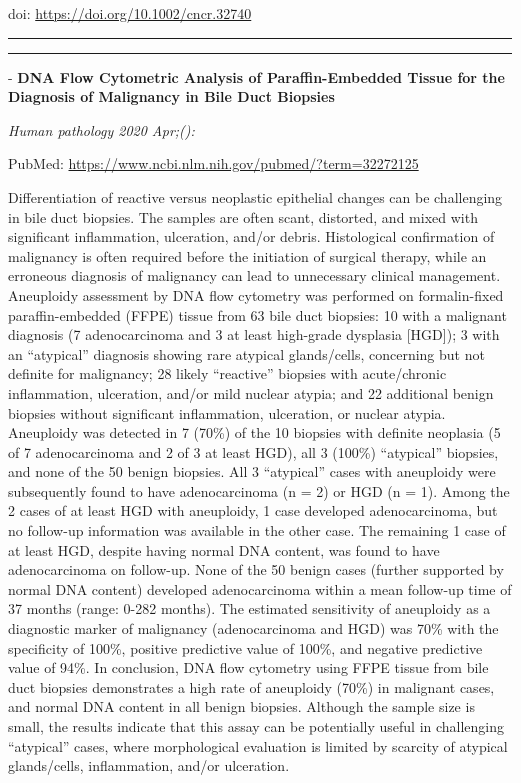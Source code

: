 \documentclass[
]{article}
\begin{document}
doi: \url{https://doi.org/10.1002/cncr.32740}

\begin{center}\rule{0.5\linewidth}{0.5pt}\end{center}

\begin{center}\rule{0.5\linewidth}{0.5pt}\end{center}

- \textbf{DNA Flow Cytometric Analysis of Paraffin-Embedded Tissue for
the Diagnosis of Malignancy in Bile Duct Biopsies}

\emph{Human pathology 2020 Apr;():}

PubMed: \url{https://www.ncbi.nlm.nih.gov/pubmed/?term=32272125}

Differentiation of reactive versus neoplastic epithelial changes can be
challenging in bile duct biopsies. The samples are often scant,
distorted, and mixed with significant inflammation, ulceration, and/or
debris. Histological confirmation of malignancy is often required before
the initiation of surgical therapy, while an erroneous diagnosis of
malignancy can lead to unnecessary clinical management. Aneuploidy
assessment by DNA flow cytometry was performed on formalin-fixed
paraffin-embedded (FFPE) tissue from 63 bile duct biopsies: 10 with a
malignant diagnosis (7 adenocarcinoma and 3 at least high-grade
dysplasia {[}HGD{]}); 3 with an ``atypical'' diagnosis showing rare
atypical glands/cells, concerning but not definite for malignancy; 28
likely ``reactive'' biopsies with acute/chronic inflammation,
ulceration, and/or mild nuclear atypia; and 22 additional benign
biopsies without significant inflammation, ulceration, or nuclear
atypia. Aneuploidy was detected in 7 (70\%) of the 10 biopsies with
definite neoplasia (5 of 7 adenocarcinoma and 2 of 3 at least HGD), all
3 (100\%) ``atypical'' biopsies, and none of the 50 benign biopsies. All
3 ``atypical'' cases with aneuploidy were subsequently found to have
adenocarcinoma (n = 2) or HGD (n = 1). Among the 2 cases of at least HGD
with aneuploidy, 1 case developed adenocarcinoma, but no follow-up
information was available in the other case. The remaining 1 case of at
least HGD, despite having normal DNA content, was found to have
adenocarcinoma on follow-up. None of the 50 benign cases (further
supported by normal DNA content) developed adenocarcinoma within a mean
follow-up time of 37 months (range: 0-282 months). The estimated
sensitivity of aneuploidy as a diagnostic marker of malignancy
(adenocarcinoma and HGD) was 70\% with the specificity of 100\%,
positive predictive value of 100\%, and negative predictive value of
94\%. In conclusion, DNA flow cytometry using FFPE tissue from bile duct
biopsies demonstrates a high rate of aneuploidy (70\%) in malignant
cases, and normal DNA content in all benign biopsies. Although the
sample size is small, the results indicate that this assay can be
potentially useful in challenging ``atypical'' cases, where
morphological evaluation is limited by scarcity of atypical
glands/cells, inflammation, and/or ulceration.
\end{document}
